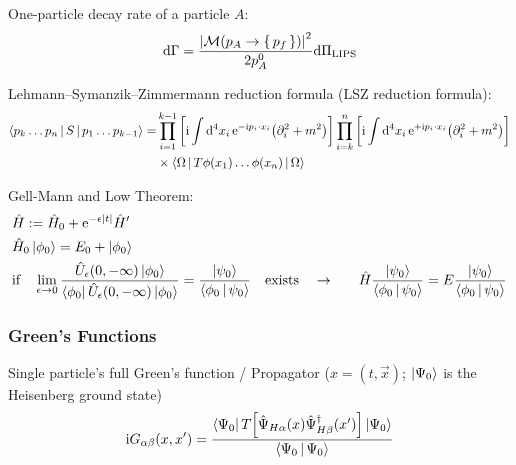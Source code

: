 		\noindent
		One-particle decay rate of a particle $A$:
		\begin{equation}
			\dd \Gamma = \frac{\abs{\mathcal{M}(p_A \to\set{p_f})}^2}{2 p_A^0} \dd \Pi_\mathrm{LIPS}
		\end{equation}

		\noindent
		Lehmann--Symanzik--Zimmermann reduction formula (LSZ reduction formula):
		\begin{equation}
			\begin{aligned}
				\Braket{p_k \hdots p_n|S|p_1 \hdots p_{k-1}} = &\prod_{i=1}^{k-1} \qty[\mathrm{i} \int \dd[4]{x_i} \mathrm{e}^{-\mathrm{i} p_i\cdot x_i} \qty(\partial^2_i+m^2)] \prod_{i=k}^{n} \qty[\mathrm{i} \int \dd[4]{x_i} \mathrm{e}^{+\mathrm{i} p_i\cdot x_i} \qty(\partial^2_i+m^2)] \\
				&\times\Braket{\Omega|T \phi(x_1) \hdots \phi(x_n)|\Omega}
			\end{aligned}
		\end{equation}

		\noindent
		Gell-Mann and Low Theorem:
		\begin{equation}
			\begin{aligned}
				&\hat{H} := \hat{H}_0 + \mathrm{e}^{-\epsilon \abs{t}} \hat{H}' \\
				&\hat{H}_0 \Ket{\phi_0} = E_0 + \Ket{\phi_0} \\
				&\text{if}\quad \lim_{\epsilon\to 0} \frac{\hat{U}_\epsilon(0,-\infty)\Ket{\phi_0}}{\Bra{\phi_0} \hat{U}_\epsilon(0,-\infty)\Ket{\phi_0}}
				= \frac{\Ket{\psi_0}}{\Braket{\phi_0|\psi_0}} \quad\text{exists}\quad
				\to&\quad \hat{H} \frac{\Ket{\psi_0}}{\Braket{\phi_0|\psi_0}} = E \frac{\Ket{\psi_0}}{\Braket{\phi_0|\psi_0}} \\
			\end{aligned}
		\end{equation}

		\subsubsection{Green's Functions}
			Single particle's full Green's function / Propagator  ($x=(t,\vec{x})$; $\Ket{\Psi_0}$ is the Heisenberg ground state)
			\begin{equation}
				\begin{aligned}
					\mathrm{i} G_{\alpha\beta}(x, x') &= \frac{\Bra{\Psi_0} T\qty[\hat{\Psi}_{H\alpha}(x)\hat{\Psi}^\dagger_{H\beta}(x')] \Ket{\Psi_0}}{\Braket{\Psi_0|\Psi_0}} \\
				\end{aligned}
			\end{equation}


